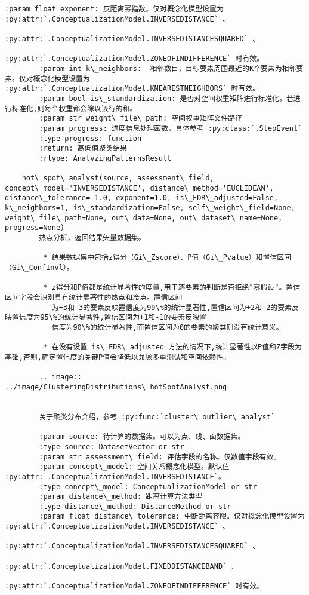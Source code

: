 \documentclass[11pt]{article}
\begin{document}
\begin{Verbatim}[commandchars=\\\{\}]
        :param float exponent: 反距离幂指数。仅对概念化模型设置为 :py:attr:`.ConceptualizationModel.INVERSEDISTANCE` 、
                                         :py:attr:`.ConceptualizationModel.INVERSEDISTANCESQUARED` 、
                                         :py:attr:`.ConceptualizationModel.ZONEOFINDIFFERENCE` 时有效。
        :param int k\_neighbors:  相邻数目，目标要素周围最近的K个要素为相邻要素。仅对概念化模型设置为 :py:attr:`.ConceptualizationModel.KNEARESTNEIGHBORS` 时有效。
        :param bool is\_standardization: 是否对空间权重矩阵进行标准化。若进行标准化,则每个权重都会除以该行的和。
        :param str weight\_file\_path: 空间权重矩阵文件路径
        :param progress: 进度信息处理函数，具体参考 :py:class:`.StepEvent`
        :type progress: function
        :return: 高低值聚类结果
        :rtype: AnalyzingPatternsResult
    
    hot\_spot\_analyst(source, assessment\_field, concept\_model='INVERSEDISTANCE', distance\_method='EUCLIDEAN', distance\_tolerance=-1.0, exponent=1.0, is\_FDR\_adjusted=False, k\_neighbors=1, is\_standardization=False, self\_weight\_field=None, weight\_file\_path=None, out\_data=None, out\_dataset\_name=None, progress=None)
        热点分析，返回结果矢量数据集。
        
         * 结果数据集中包括z得分（Gi\_Zscore）、P值（Gi\_Pvalue）和置信区间（Gi\_ConfInvl）。
        
         * z得分和P值都是统计显著性的度量,用于逐要素的判断是否拒绝"零假设"。置信区间字段会识别具有统计显著性的热点和冷点。置信区间
           为+3和-3的要素反映置信度为99\%的统计显著性,置信区间为+2和-2的要素反映置信度为95\%的统计显著性,置信区间为+1和-1的要素反映置
           信度为90\%的统计显著性,而置信区间为0的要素的聚类则没有统计意义。
        
         * 在没有设置 is\_FDR\_adjusted 方法的情况下,统计显著性以P值和Z字段为基础,否则,确定置信度的关键P值会降低以兼顾多重测试和空间依赖性。
        
        .. image:: ../image/ClusteringDistributions\_hotSpotAnalyst.png
        
        
        关于聚类分布介绍，参考 :py:func:`cluster\_outlier\_analyst`
        
        :param source: 待计算的数据集。可以为点、线、面数据集。
        :type source: DatasetVector or str
        :param str assessment\_field: 评估字段的名称。仅数值字段有效。
        :param concept\_model: 空间关系概念化模型。默认值 :py:attr:`.ConceptualizationModel.INVERSEDISTANCE`。
        :type concept\_model: ConceptualizationModel or str
        :param distance\_method: 距离计算方法类型
        :type distance\_method: DistanceMethod or str
        :param float distance\_tolerance: 中断距离容限。仅对概念化模型设置为 :py:attr:`.ConceptualizationModel.INVERSEDISTANCE` 、
                                         :py:attr:`.ConceptualizationModel.INVERSEDISTANCESQUARED` 、
                                         :py:attr:`.ConceptualizationModel.FIXEDDISTANCEBAND` 、
                                         :py:attr:`.ConceptualizationModel.ZONEOFINDIFFERENCE` 时有效。
        

\end{Verbatim}
\end{document}
